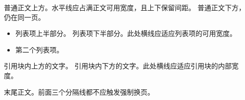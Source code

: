 \documentclass{article}
\begin{document}
普通正文上方。水平线应占满正文可用宽度，且上下保留间距。
\Separator{}
普通正文下方，仍在同一页。

\begin{itemize}
  \item 列表项上半部分。
  \Separator{}
  列表项下半部分。此处横线应适应列表项的可用宽度。
  \item 第二个列表项。
\end{itemize}

\begin{quoteblock}
引用块内上方的文字。
\Separator{}
引用块内下方的文字。此处横线应适应引用块的内部宽度。
\end{quoteblock}

末尾正文。前面三个分隔线都不应触发强制换页。
\end{document}
